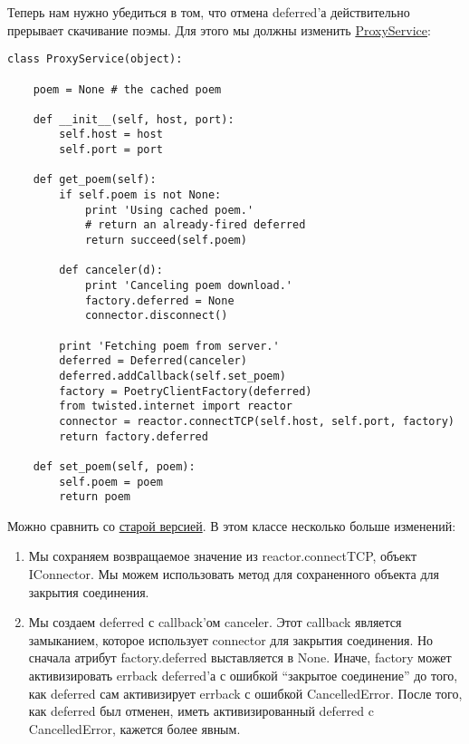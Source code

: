 Теперь нам нужно убедиться в том, что отмена deferred'а 
действительно прерывает скачивание поэмы. Для этого мы должны 
изменить \href{http://github.com/jdavisp3/twisted-intro/blob/master/twisted-server-4/poetry-proxy.py#L105}{ProxyService}: 

 \begin{verbatim}
class ProxyService(object):

    poem = None # the cached poem

    def __init__(self, host, port):
        self.host = host
        self.port = port

    def get_poem(self):
        if self.poem is not None:
            print 'Using cached poem.'
            # return an already-fired deferred
            return succeed(self.poem)

        def canceler(d):
            print 'Canceling poem download.'
            factory.deferred = None
            connector.disconnect()

        print 'Fetching poem from server.'
        deferred = Deferred(canceler)
        deferred.addCallback(self.set_poem)
        factory = PoetryClientFactory(deferred)
        from twisted.internet import reactor
        connector = reactor.connectTCP(self.host, self.port, factory)
        return factory.deferred

    def set_poem(self, poem):
        self.poem = poem
        return poem
\end{verbatim} 

Можно сравнить со 
\href{http://github.com/jdavisp3/twisted-intro/blob/master/twisted-server-2/poetry-proxy.py#100}{старой версией}. 
В этом классе несколько больше изменений:

\begin{enumerate}

\item Мы сохраняем возвращаемое значение из reactor.connectTCP, 
    объект IConnector. Мы можем использовать метод для сохраненного 
    объекта для закрытия соединения.

\item Мы создаем deferred с callback'ом canceler. Этот 
    callback является замыканием, которое использует 
    connector для закрытия соединения. Но сначала атрибут 
    factory.deferred выставляется в None. Иначе, factory 
    может активизировать errback deferred'а с ошибкой ``закрытое 
    соединение'' до того, как deferred сам активизирует errback  
    с ошибкой CancelledError. После того, как deferred 
    был отменен, иметь активизированный deferred c CancelledError, 
    кажется более явным.

\end{enumerate}



